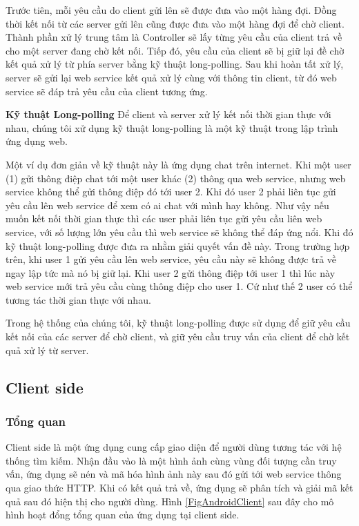 {Trước tiên, mỗi yêu cầu do client gửi lên sẽ được đưa vào một hàng đợi. Đồng thời kết nối từ các server gửi lên cũng được đưa vào một hàng đợi để chờ client. Thành phần xử lý trung tâm là Controller sẽ lấy từng yêu cầu của client trả về cho một server đang chờ kết nối. Tiếp đó, yêu cầu của client sẽ bị giữ lại đề chờ kết quả xử lý từ phía server bằng kỹ thuật long-polling. Sau khi hoàn tất xử lý, server sẽ gửi lại web service kết quả xử lý cùng với thông tin client, từ đó web service sẽ đáp trả yêu cầu của client tương ứng.

\textbf{Kỹ thuật Long-polling}
Để client và server xử lý kết nối thời gian thực với nhau, chúng tôi xử dụng kỹ thuật long-polling là một kỹ thuật trong lập trình ứng dụng web.

Một ví dụ đơn giản về kỹ thuật này là ứng dụng chat trên internet. Khi một user (1) gửi thông điệp chat tới một user khác (2) thông qua web service, nhưng web service không thể gửi thông điệp đó tới user 2. Khi đó user 2 phải liên tục gửi yêu cầu lên web service để xem có ai chat với mình hay không. Như vậy nếu muốn kết nối thời gian thực thì các user phải liên tục gửi yêu cầu liên web service, với số lượng lớn yêu cầu thì web service sẽ không thể đáp ứng nổi. Khi đó kỹ thuật long-polling được đưa ra nhằm giải quyết vấn đề này. Trong trường hợp trên, khi user 1 gửi yêu cầu lên web service, yêu cầu này sẽ không được trả về ngay lập tức mà nó bị giữ lại. Khi user 2 gửi thông điệp tới user 1 thì lúc này web service mới trả yêu cầu cùng thông điệp cho user 1. Cứ như thế 2 user có thể tương tác thời gian thực với nhau.

Trong hệ thống của chúng tôi, kỹ thuật long-polling được sử dụng để giữ yêu cầu kết nối của các server để chờ client, và giữ yêu cầu truy vấn của client để chờ kết quả xử lý từ server.

\subsection{Client side}
\subsubsection{Tổng quan}
Client side là một ứng dụng cung cấp giao diện để người dùng tương tác với hệ thống tìm kiếm. Nhận đầu vào là một hình ảnh cùng vùng đối tượng cần truy vấn, ứng dụng sẽ nén và mã hóa hình ảnh này sau đó gửi tới web service thông qua giao thức HTTP. Khi có kết quả trả về, ứng dụng sẽ phân tích và giải mã kết quả sau đó hiện thị cho người dùng. Hình \ref{FigAndroidClient} sau đây cho mô hình hoạt đổng tổng quan của ứng dụng tại client side.

}
